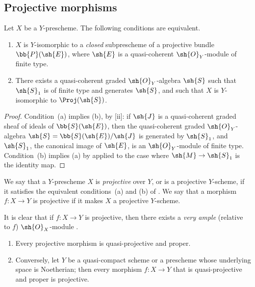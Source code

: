\subsection{Projective morphisms}
\label{subsection:II.5.5}

\begin{proposition}[5.5.1]
\label{II.5.5.1}
Let $X$ be a $Y$-prescheme.
The following conditions are equivalent.
\begin{enumerate}
  \item[{\rm(a)}] $X$ is $Y$-isomorphic to a \emph{closed} subprescheme of a projective bundle $\bb{P}(\sh{E})$, where $\sh{E}$ is a quasi-coherent $\sh{O}_Y$-module of finite type.
  \item[{\rm(b)}] There exists a quasi-coherent graded $\sh{O}_Y$-algebra $\sh{S}$ such that $\sh{S}_1$ is of finite type and generates $\sh{S}$, and such that $X$ is $Y$-isomorphic to $\Proj(\sh{S})$.
\end{enumerate}
\end{proposition}

\begin{proof}
Condition~(a) implies (b), by [ii]: if $\sh{J}$ is a quasi-coherent graded sheaf of ideals of $\bb{S}(\sh{E})$, then the quasi-coherent graded $\sh{O}_Y$-algebra $\sh{S}=\bb{S}(\sh{E})/\sh{J}$ is generated by $\sh{S}_1$, and $\sh{S}_1$, the canonical image of $\sh{E}$, is an $\sh{O}_Y$-module of finite type.
Condition~(b) implies (a) by  applied to the case where $\sh{M}\to\sh{S}_1$ is the identity map.
\end{proof}

\begin{definition}[5.5.2]
\label{II.5.5.2}
We say that a $Y$-prescheme $X$ is \emph{projective} over $Y$, or is a projective $Y$-scheme, if it satisfies the equivalent conditions~(a) and (b) of .
We say that a morphism $f:X\to Y$ is projective if it makes $X$ a projective $Y$-scheme.
\end{definition}

It is clear that if $f:X\to Y$ is projective, then there exists a \emph{very ample} (relative to $f$) $\sh{O}_X$-module .
\begin{theorem}[5.5.3]
\label{II.5.5.3}
\medskip\noindent
\begin{enumerate}
  \item[{\rm(i)}] Every projective morphism is quasi-projective and proper.
  \item[{\rm(ii)}] Conversely, let $Y$ be a quasi-compact scheme or a prescheme whose underlying space is Noetherian; then every morphism $f:X\to Y$ that is quasi-projective and proper is projective.
\end{enumerate}
\end{theorem}

